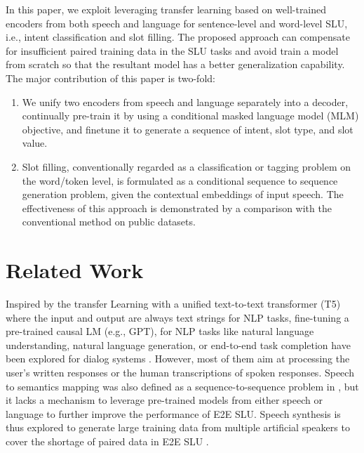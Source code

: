 \documentclass{article}
\begin{document}
In this paper, we exploit leveraging transfer learning based on well-trained encoders from both speech and language for sentence-level and word-level SLU, i.e., intent classification and slot filling. The proposed approach can compensate for insufficient paired training data in the SLU tasks and avoid train a model from scratch so that the resultant model has a better generalization capability. 
The major contribution of this paper is two-fold:
\begin{enumerate}
\item	We unify two encoders from speech and language separately into a decoder, continually pre-train it by using a conditional masked language model (MLM) objective, and finetune it to generate a sequence of intent, slot type, and slot value.
\item	Slot filling, conventionally regarded as a classification or tagging problem on the word/token level, is formulated as a conditional sequence to sequence generation problem, given the contextual embeddings of input speech. The effectiveness of this approach is demonstrated by a comparison with the conventional method on public datasets.  

\end{enumerate}

\section{Related Work}
\label{sec:RelatedWork}

Inspired by the transfer Learning with a unified text-to-text transformer (T5) \cite{raffel2019exploring} where the input and output are always text strings for NLP tasks,  fine-tuning a pre-trained causal  LM (e.g., GPT), for NLP tasks like natural language understanding, natural language generation, or end-to-end task completion have been explored for dialog systems \cite{DBLP:journals/corr/abs-1902-10909,peng2020few,wu2019transferable,budzianowski2019hello}. However, most of them aim at processing the user’s written responses or the human transcriptions of spoken responses. Speech to semantics mapping was also defined as a sequence-to-sequence problem in \cite{haghani2018audio,9053063}, but it lacks a mechanism to leverage pre-trained models from either speech or language to further improve the performance of E2E SLU. Speech synthesis is thus explored to generate large training data from multiple artificial speakers to cover the shortage of paired data in E2E SLU \cite{9053281,9053063}.
\end{document}
